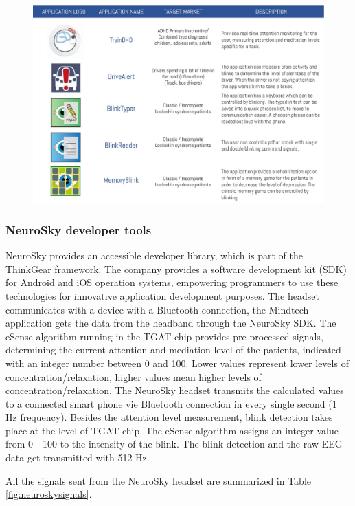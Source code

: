 \documentclass[letterpaper,10pt]{article}
\begin{document}
\begin{figure}[h]
\centering
\includegraphics[scale=0.3]{apps.jpg}
\label{fig:apps}
\end{figure}


\subsubsection{NeuroSky developer tools}

NeuroSky provides an accessible developer library, which is part of the ThinkGear framework. The company provides a software development kit (SDK) for Android and iOS operation systems, empowering programmers to use these technologies for innovative application development purposes. The headset communicates with a device with a Bluetooth connection, the Mindtech application gets the data from the headband through the NeuroSky SDK. The eSense algorithm running in the TGAT chip provides pre-processed signals, determining the current attention and mediation level of the patients, indicated with an integer number between 0 and 100. Lower values represent lower levels of concentration/relaxation, higher values mean higher levels of concentration/relaxation. The NeuroSky headset transmits the calculated values to a connected smart phone vie Bluetooth connection in every single second (1 Hz frequency).
Besides the attention level measurement, blink detection takes place at the level of TGAT chip. The eSense algorithm assigns an integer value from 0 - 100 to the intensity of the blink. The blink detection and the raw EEG data get transmitted with 512 Hz. \cite{neurosky3}

All the signals sent from the NeuroSky headset are summarized in Table \ref{fig:neuroskysignals}.
\end{document}
